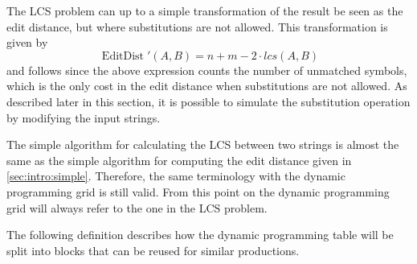 \documentclass[twoside,11pt,openright]{report}
\newcommand{\EditDist}{\operatorname{EditDist}}
\begin{document}
The LCS problem can up to a simple transformation of the result be seen as the edit distance, but where substitutions are not allowed. This transformation is given by
\[
  \EditDist'(A, B) = n + m - 2 \cdot lcs(A, B)
\]
and follows since the above expression counts the number of unmatched symbols, which is the only cost in the edit distance when substitutions are not allowed. As described later in this section, it is possible to simulate the substitution operation by modifying the input strings.

The simple algorithm for calculating the LCS between two strings is almost the same as the simple algorithm for computing the edit distance given in \cref{sec:intro:simple}. Therefore, the same terminology with the dynamic programming grid is still valid. From this point on the dynamic programming grid will always refer to the one in the LCS problem.

The following definition describes how the dynamic programming table will be split into blocks that can be reused for similar productions.
\end{document}
